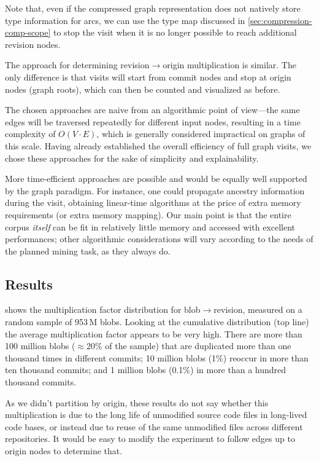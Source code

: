 Note that, even if the compressed graph representation does not natively store
type information for arcs, we can use the type map discussed in
\cref{sec:compression-comp-scope} to stop the visit when it is no longer
possible to reach additional revision nodes.

The approach for determining revision$\to$origin multiplication is similar.
The only difference is that visits will start from commit nodes and stop at
origin nodes (graph roots), which can then be counted and visualized as before.

The chosen approaches are naive from an algorithmic point of view---the same
edges will be traversed repeatedly for different input nodes,
resulting in a time complexity of $O(V\cdot E)$, which is generally considered
impractical on graphs of this scale.  Having already established the overall
efficiency of full graph visits, we chose these approaches for the sake of
simplicity and explainability.

More time-efficient approaches are possible and would be equally well supported
by the graph paradigm. For instance, one could propagate ancestry information
during the visit, obtaining linear-time algorithms at the price of extra memory
requirements (or extra memory mapping). Our main point is that the entire
corpus \emph{itself} can be fit in relatively little memory and accessed with
excellent performances; other algorithmic considerations will vary according to
the needs of the planned mining task, as they always do.


\subsection{Results}

 shows the multiplication factor
distribution for blob$\to$revision, measured on a random sample of 953\,M
blobs. Looking at the cumulative distribution (top line) the average
multiplication factor appears to be very high. There are more than 100 million
blobs ($\approx$20\% of the sample) that are duplicated more than one
thousand times in different commits; 10 million blobs (1\%) reoccur in more
than ten thousand commits; and 1 million blobs (0.1\%) in more than a
hundred thousand commits.

As we didn't partition by origin, these results do not say whether this
multiplication is due to the long life of unmodified source code files in
long-lived code bases, or instead due to reuse of the same unmodified files
across different repositories. It would be easy to modify the experiment to
follow edges up to origin nodes to determine that.

